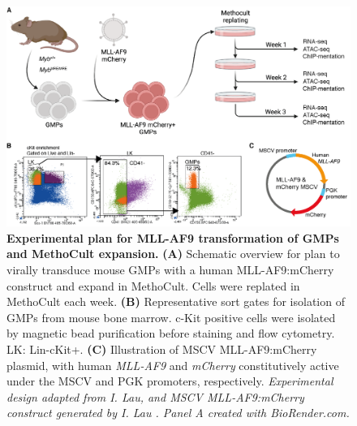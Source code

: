 \begin{figure}[!b]
    \centering
    \includegraphics[width=\textwidth,height=\textheight,keepaspectratio]{figures/chapter5/ch5_overview.png}
    \caption[{Experimental plan for MLL-AF9 transformation of GMPs and MethoCult expansion.}]
    {\textbf{Experimental plan for MLL-AF9 transformation of GMPs and MethoCult expansion.}
    \textbf{(A)} Schematic overview for plan to virally transduce mouse GMPs with a human MLL-AF9:mCherry construct and expand in MethoCult. Cells were replated in MethoCult each week. 
    \textbf{(B)} Representative sort gates for isolation of GMPs from mouse bone marrow. c-Kit positive cells were isolated by magnetic bead purification before staining and flow cytometry. LK: Lin-cKit+. 
    \textbf{(C)} Illustration of MSCV MLL-AF9:mCherry plasmid, with human \textit{MLL-AF9} and \textit{mCherry} constitutively active under the MSCV and PGK promoters, respectively. 
    \textit{Experimental design adapted from I. Lau, and MSCV MLL-AF9:mCherry construct generated by I. Lau \citep{lau_role_2022}. Panel A created with BioRender.com. }
    }
    \label{fig:ch5_overview}
\end{figure}

